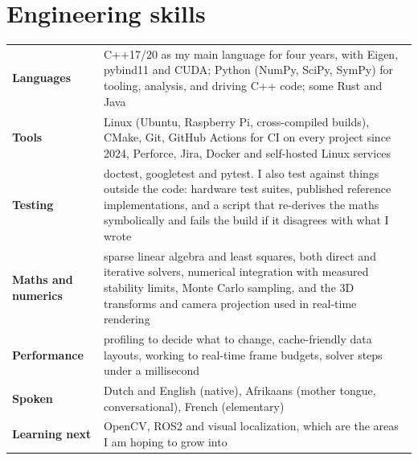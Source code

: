 \documentclass[10pt,a4paper]{article}
\begin{document}
\section{Engineering skills}
\begin{tabularx}{\textwidth}{@{}p{3.1cm}X@{}}
\textbf{Languages} & C++17/20 as my main language for four years, with Eigen, pybind11 and CUDA; Python (NumPy, SciPy, SymPy) for tooling, analysis, and driving C++ code; some Rust and Java \\
\textbf{Tools} & Linux (Ubuntu, Raspberry Pi, cross-compiled builds), CMake, Git, GitHub Actions for CI on every project since 2024, Perforce, Jira, Docker and self-hosted Linux services \\
\textbf{Testing} & doctest, googletest and pytest. I also test against things outside the code: hardware test suites, published reference implementations, and a script that re-derives the maths symbolically and fails the build if it disagrees with what I wrote \\
\textbf{Maths and numerics} & sparse linear algebra and least squares, both direct and iterative solvers, numerical integration with measured stability limits, Monte Carlo sampling, and the 3D transforms and camera projection used in real-time rendering \\
\textbf{Performance} & profiling to decide what to change, cache-friendly data layouts, working to real-time frame budgets, solver steps under a millisecond \\
\textbf{Spoken} & Dutch and English (native), Afrikaans (mother tongue, conversational), French (elementary) \\
\textbf{Learning next} & OpenCV, ROS2 and visual localization, which are the areas I am hoping to grow into \\
\end{tabularx}

\end{document}
